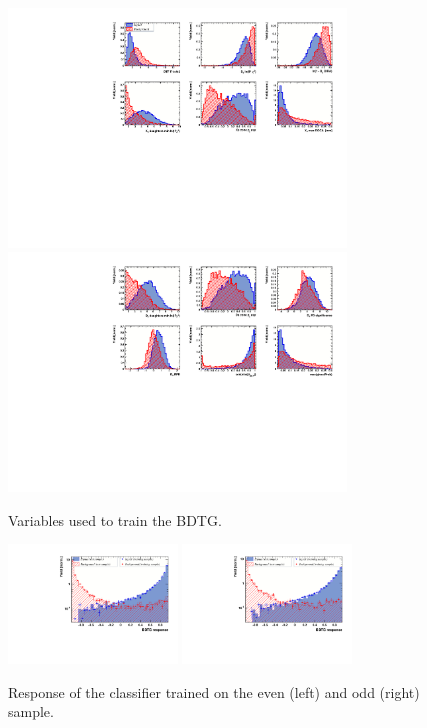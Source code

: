 \setcounter{figure}{0}
\setcounter{table}{0}

\renewcommand{\thefigure}{A.\arabic{figure}}

\begin{figure}[h]
\centering
\includegraphics[height=!,width=0.8\textwidth]{figs/TMVA/BDTG_Data_run1_t0_even/variables_id_c1.pdf}
\includegraphics[height=!,width=0.8\textwidth]{figs/TMVA/BDTG_Data_run1_t0_even/variables_id_c2.pdf}
\caption{Variables used to train the BDTG.}
\label{fig:}
\end{figure}

\begin{figure}[h]
\centering
\includegraphics[height=!,width=0.4\textwidth]{figs/TMVA/BDTG_Data_run1_t0_even/overtrain_BDTG.pdf}
\includegraphics[height=!,width=0.4\textwidth]{figs/TMVA/BDTG_Data_run1_t0_odd/overtrain_BDTG.pdf}
\caption{Response of the classifier trained on the even (left) and odd (right) sample.}
\label{fig:}
\end{figure}


